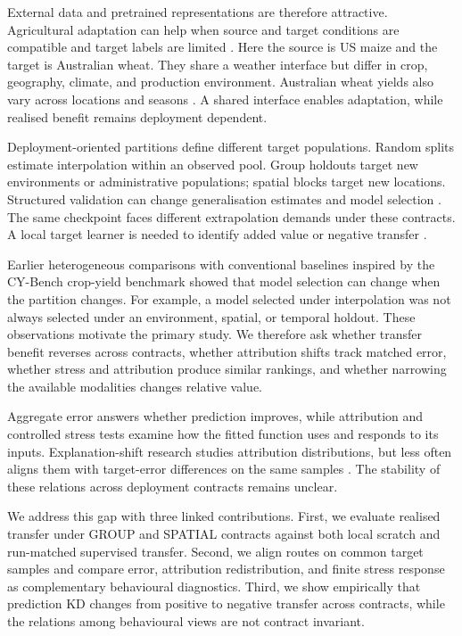\documentclass[runningheads]{venue/lncs/llncs}
\begin{document}
External data and pretrained representations are therefore attractive. Agricultural adaptation can help when source and target conditions are compatible and target labels are limited \cite{Bohra2025KenyaTransfer,Priyatikanto2023MaizeAdaptation}. Here the source is US maize and the target is Australian wheat. They share a weather interface but differ in crop, geography, climate, and production environment. Australian wheat yields also vary across locations and seasons \cite{Brown2020AustralianWheat,Potgieter2002AustralianWheat}. A shared interface enables adaptation, while realised benefit remains deployment dependent.

Deployment-oriented partitions define different target populations. Random splits estimate interpolation within an observed pool. Group holdouts target new environments or administrative populations; spatial blocks target new locations. Structured validation can change generalisation estimates and model selection \cite{Meyer2021AOA,Meyer2022MLMaps,Roberts2017StructuredCV}. The same checkpoint faces different extrapolation demands under these contracts. A local target learner is needed to identify added value or negative transfer \cite{Wang2019NegativeTransfer}.

Earlier heterogeneous comparisons with conventional baselines inspired by the CY-Bench crop-yield benchmark showed that model selection can change when the partition changes. For example, a model selected under interpolation was not always selected under an environment, spatial, or temporal holdout. These observations motivate the primary study. We therefore ask whether transfer benefit reverses across contracts, whether attribution shifts track matched error, whether stress and attribution produce similar rankings, and whether narrowing the available modalities changes relative value.

Aggregate error answers whether prediction improves, while attribution and controlled stress tests examine how the fitted function uses and responds to its inputs. Explanation-shift research studies attribution distributions, but less often aligns them with target-error differences on the same samples \cite{Kulinski2023ExplainingShift,Mougan2025ExplanationShift}. The stability of these relations across deployment contracts remains unclear.

We address this gap with three linked contributions. First, we evaluate realised transfer under GROUP and SPATIAL contracts against both local scratch and run-matched supervised transfer. Second, we align routes on common target samples and compare error, attribution redistribution, and finite stress response as complementary behavioural diagnostics. Third, we show empirically that prediction KD changes from positive to negative transfer across contracts, while the relations among behavioural views are not contract invariant.
\end{document}
